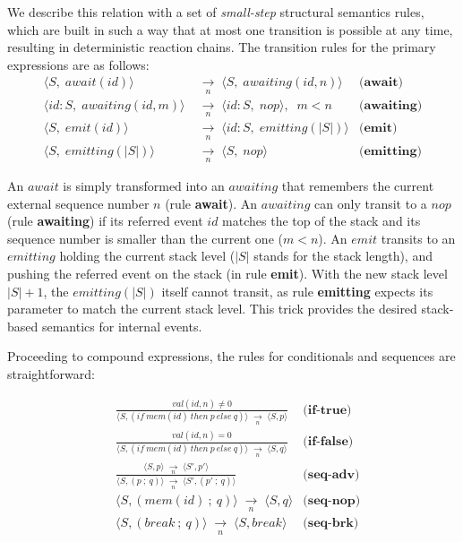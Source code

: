 \documentclass{sigplanconf}
\newcommand{\CEU}{\textsc{C\'{e}u}\xspace}
\newcommand{\code}[1] {{\small{\texttt{#1}}}}
\newcommand{\ST}{\1\xrightarrow[~n~]{}\1}
\newcommand{\LL}{\langle}
\newcommand{\RR}{\rangle}
\newcommand{\DS}{\displaystyle}
\newcommand{\1}{\;}
\newcommand{\2}{\;\;}
\newcommand{\3}{\;\;\;}
\newcommand{\5}{\;\;\;\;\;}
\begin{document}
We describe this relation with a set of \emph{small-step} structural semantics 
rules, which are built in such a way that at most one transition is possible at 
any time, resulting in deterministic reaction chains.
%
The transition rules for the primary expressions are as follows:
%
{ \setlength{\jot}{20pt}
\begin{align*}
\LL S,\1await(id) \RR &\ST
\LL S,\1awaiting(id,n) \RR
    & \textbf{(await)}      \\
\LL id:S,\1awaiting(id,m) \RR &\ST
\LL id:S,\1nop \RR, \2m<n
    & \textbf{(awaiting)}   \\
\LL S,\1emit(id) \RR &\ST
\LL id:S,\1emitting(|S|) \RR
    & \textbf{(emit)}       \\
\LL S,\1emitting(|S|) \RR &\ST
\LL S,\1nop \RR
    & \textbf{(emitting)}
\end{align*}
}

An $await$ is simply transformed into an $awaiting$ that remembers the current 
external sequence number $n$ (rule \textbf{await}).
An $awaiting$ can only transit to a $nop$ (rule \textbf{awaiting}) if its 
referred event $id$ matches the top of the stack and its sequence number is 
smaller than the current one ($m<n$).
%
%
An $emit$ transits to an $emitting$ holding the current stack level ($|S|$ 
stands for the stack length), and pushing the referred event on the stack (in 
rule \textbf{emit}).
With the new stack level $|S|+1$, the $emitting(|S|)$ itself cannot transit, as 
rule \textbf{emitting} expects its parameter to match the current stack level.
This trick provides the desired stack-based semantics for internal events.

Proceeding to compound expressions, the rules for conditionals and sequences 
are straightforward:

{ \setlength{\jot}{20pt}
\begin{eqnarray*}
& \frac
    { \DS val(id,n) \neq 0 }
    { \DS \LL S, (if~mem(id)~then~p~else~q) \RR \ST
          \LL S, p \RR }
    & \textbf{(if-true)}       \\
& \frac
    { \DS val(id,n) = 0 }
    { \DS \LL S, (if~mem(id)~then~p~else~q) \RR \ST
          \LL S, q \RR }
    & \textbf{(if-false)}       \\
& \frac
    {\DS \LL S,p \RR \ST \LL S',p' \RR }
    {\DS \LL S, (p~;~q) \RR \ST \LL S', (p'~;~q) \RR }
    & \textbf{(seq-adv)}      \\
& \LL S, (mem(id)~;~q) \RR \ST  \LL S, q \RR
    & \textbf{(seq-nop)}      \\
& \LL S, (break~;~q) \RR \ST \LL S, break \RR
    & \textbf{(seq-brk)}
\end{eqnarray*}
}
\end{document}
